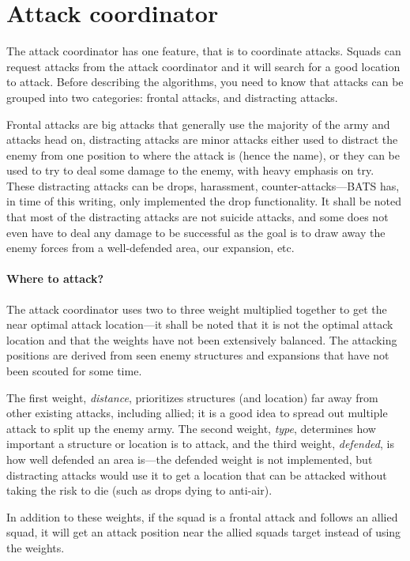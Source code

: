 
\section{Attack coordinator}
The attack coordinator has one feature, that is to coordinate attacks. Squads can request attacks from the attack coordinator and it will search for a good location to attack. Before describing the algorithms, you need to know that attacks can be grouped into two categories: frontal attacks, and distracting attacks.

Frontal attacks are big attacks that generally use the majority of the army and attacks head on, distracting attacks are minor attacks either used to distract the enemy from one position to where the attack is (hence the name), or they can be used to try to deal some damage to the enemy, with heavy emphasis on try. These distracting attacks can be drops, harassment, counter-attacks—BATS has, in time of this writing, only implemented the drop functionality. It shall be noted that most of the distracting attacks are not suicide attacks, and some does not even have to deal any damage to be successful as the goal is to draw away the enemy forces from a well-defended area, our expansion, etc.

\paragraph{Where to attack?}
The attack coordinator uses two to three weight multiplied together to get the near optimal attack location—it shall be noted that it is not the optimal attack location and that the weights have not been extensively balanced. The attacking positions are derived from seen enemy structures and expansions that have not been scouted for some time.

The first weight, \emph{distance}, prioritizes structures (and location) far away from other existing attacks, including allied; it is a good idea to spread out multiple attack to split up the enemy army. The second weight, \emph{type}, determines how important a structure or location is to attack, and the third weight, \emph{defended}, is how well defended an area is—the defended weight is not implemented, but distracting attacks would use it to get a location that can be attacked without taking the risk to die (such as drops dying to anti-air).

In addition to these weights, if the squad is a frontal attack and follows an allied squad, it will get an attack position near the allied squads target instead of using the weights.


